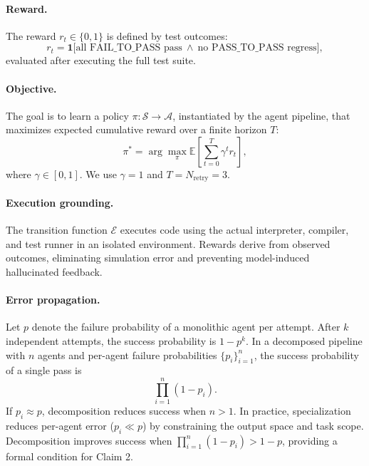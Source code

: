 \documentclass[journal]{IEEEtran}
\begin{document}
\paragraph{Reward.}
The reward $r_t \in \{0,1\}$ is defined by test outcomes:
\begin{equation}
r_t = \mathbf{1}\big[\text{all FAIL\_TO\_PASS pass} \ \wedge\ \text{no PASS\_TO\_PASS regress}\big],
\end{equation}
evaluated after executing the full test suite.

\paragraph{Objective.}
The goal is to learn a policy $\pi: \mathcal{S} \rightarrow \mathcal{A}$, instantiated by the agent pipeline, that maximizes expected cumulative reward over a finite horizon $T$:
\begin{equation}
\pi^* = \arg\max_{\pi} \mathbb{E}\left[\sum_{t=0}^{T} \gamma^t r_t \right],
\end{equation}
where $\gamma \in [0,1]$. We use $\gamma = 1$ and $T = N_{\text{retry}} = 3$.

\paragraph{Execution grounding.}
The transition function $\mathcal{E}$ executes code using the actual interpreter, compiler, and test runner in an isolated environment. Rewards derive from observed outcomes, eliminating simulation error and preventing model-induced hallucinated feedback.

\paragraph{Error propagation.}
Let $p$ denote the failure probability of a monolithic agent per attempt. After $k$ independent attempts, the success probability is $1 - p^k$. In a decomposed pipeline with $n$ agents and per-agent failure probabilities $\{p_i\}_{i=1}^n$, the success probability of a single pass is
\begin{equation}
\prod_{i=1}^{n} (1 - p_i).
\end{equation}
If $p_i \approx p$, decomposition reduces success when $n > 1$. In practice, specialization reduces per-agent error ($p_i \ll p$) by constraining the output space and task scope. Decomposition improves success when $\prod_{i=1}^{n} (1 - p_i) > 1 - p$, providing a formal condition for Claim 2.
\end{document}
